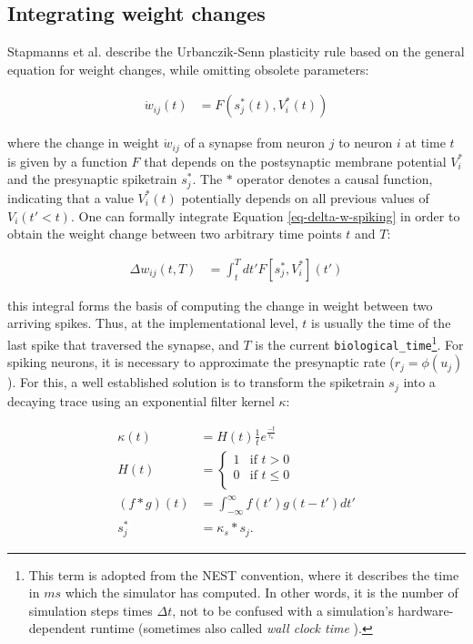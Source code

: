 \subsection{Integrating weight changes}


Stapmanns et al. describe the Urbanczik-Senn plasticity rule based on the general equation for weight changes, while
omitting obsolete parameters:

\begin{align}
  \dot{w}_{ij}(t) & = F(s_j^\ast (t), V_i^\ast (t)) \label{eq-delta-w-spiking}
\end{align}

where the change in weight $\dot{w}_{ij}$ of a synapse from neuron $j$ to neuron $i$ at time $t$ is given by a function
$F$ that depends on the postsynaptic membrane potential $V_i^\ast$ and the presynaptic spiketrain $s_j^\ast$. The $\ast$
operator denotes a causal function, indicating that a value $V_i^\ast(t)$ potentially depends on all previous values of
$V_i(t' < t)$. One can formally integrate Equation \ref{eq-delta-w-spiking} in order to obtain the weight change between
two arbitrary time points $t$ and $T$:

\begin{align}
  \Delta w_{ij}(t,T) & = \int_t^T dt' F[s_j^\ast, V_i^\ast](t') \label{eq-delta-w-t-T}
\end{align}

this integral forms the basis of computing the change in weight between two arriving spikes. Thus, at the
implementational level, $t$ is usually the time of the last spike that traversed the synapse, and $T$ is the current
\texttt{biological\_time}\footnote{This term is adopted from the NEST convention, where it describes the time in $ms$
which the simulator has computed. In other words, it is the number of simulation steps times $\Delta t$, not to be
confused with a simulation's hardware-dependent runtime (sometimes also called \textit{wall clock time}
\citep{albada2018performance}). }. For spiking neurons, it is necessary to approximate the presynaptic rate
($r_j=\phi(u_j)$). For this, a well established solution is to transform the spiketrain $s_j$ into a decaying trace
using an exponential filter kernel $\kappa$:

\begin{align}
  \kappa(t)     & = H(t) \frac{1}{t}e^{\frac{-t}{\tau_{\kappa}}}                        \\
  H(t)          & =
  \begin{cases}
    1 & \text{if $t > 0$}    \\
    0 & \text{if $t \leq 0$} \\
  \end{cases}                                                              \\
  (f \ast g)(t) & = \int_{- \infty }^{\infty} f(t') g(t-t') d t' \label{eq-convolution} \\
  s_j^\ast      & = \kappa_s \ast s_j. \label{eq-spike-trace}
\end{align}


